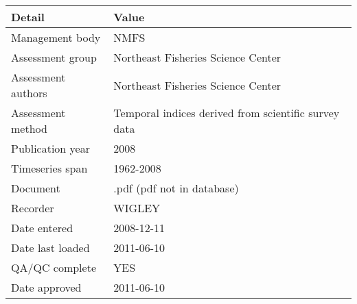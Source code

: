 \begin{table}[htb]
\centering
\begin{tabular}{lp{7cm}}
\toprule
Detail & Value \\
\midrule
Management body    & NMFS                                                 \\
Assessment group   & Northeast Fisheries Science Center                   \\
Assessment authors & Northeast Fisheries Science Center                   \\
Assessment method  & Temporal indices derived from scientific survey data \\
Publication year   & 2008                                                 \\
Timeseries span    & 1962-2008                                            \\
Document           & .pdf (pdf not in database)                           \\
Recorder           & WIGLEY                                               \\
Date entered       & 2008-12-11                                           \\
Date last loaded   & 2011-06-10                                           \\
QA/QC complete     & YES                                                  \\
Date approved      & 2011-06-10                                           \\
\bottomrule
\end{tabular}
\label{tab:assessdet}
\end{table}
